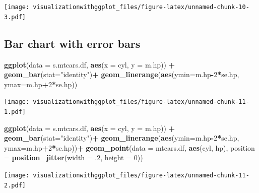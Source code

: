 \documentclass[]{krantz}
\makeatletter
\newenvironment{Shaded}{\begin{snugshade}}{\end{snugshade}}
\newcommand{\KeywordTok}[1]{\textcolor[rgb]{0.13,0.29,0.53}{\textbf{#1}}}
\newcommand{\DataTypeTok}[1]{\textcolor[rgb]{0.13,0.29,0.53}{#1}}
\newcommand{\DecValTok}[1]{\textcolor[rgb]{0.00,0.00,0.81}{#1}}
\newcommand{\StringTok}[1]{\textcolor[rgb]{0.31,0.60,0.02}{#1}}
\newcommand{\OperatorTok}[1]{\textcolor[rgb]{0.81,0.36,0.00}{\textbf{#1}}}
\newcommand{\NormalTok}[1]{#1}
\newenvironment{kframe}{%
\medskip{}
\setlength{\fboxsep}{.8em}
 \def\at@end@of@kframe{}%
 \ifinner\ifhmode%
  \def\at@end@of@kframe{\end{minipage}}%
  \begin{minipage}{\columnwidth}%
 \fi\fi%
 \def\FrameCommand##1{\hskip\@totalleftmargin \hskip-\fboxsep
 \colorbox{shadecolor}{##1}\hskip-\fboxsep
     \hskip-\linewidth \hskip-\@totalleftmargin \hskip\columnwidth}%
 \MakeFramed {\advance\hsize-\width
   \@totalleftmargin\z@ \linewidth\hsize
   \@setminipage}}%
 {\par\unskip\endMakeFramed%
 \at@end@of@kframe}
\renewenvironment{Shaded}{\begin{kframe}}{\end{kframe}}
\theoremstyle{definition}
\theoremstyle{definition}
\theoremstyle{definition}
\theoremstyle{remark}
\makeatother
\begin{document}
\texttt{[image: visualizationwithggplot\_files/figure-latex/unnamed-chunk-10-3.pdf]}

\subsection{Bar chart with error bars}\label{bar-chart-with-error-bars}

\begin{Shaded}
\begin{Highlighting}[]
\KeywordTok{ggplot}\NormalTok{(}\DataTypeTok{data =}\NormalTok{ s.mtcars.df, }\KeywordTok{aes}\NormalTok{(}\DataTypeTok{x =}\NormalTok{ cyl, }\DataTypeTok{y =}\NormalTok{ m.hp)) }\OperatorTok{+}
\StringTok{  }\KeywordTok{geom_bar}\NormalTok{(}\DataTypeTok{stat=}\StringTok{"identity"}\NormalTok{)}\OperatorTok{+}
\StringTok{  }\KeywordTok{geom_linerange}\NormalTok{(}\KeywordTok{aes}\NormalTok{(}\DataTypeTok{ymin=}\NormalTok{m.hp}\OperatorTok{-}\DecValTok{2}\OperatorTok{*}\NormalTok{se.hp, }\DataTypeTok{ymax=}\NormalTok{m.hp}\OperatorTok{+}\DecValTok{2}\OperatorTok{*}\NormalTok{se.hp))}
\end{Highlighting}
\end{Shaded}

\texttt{[image: visualizationwithggplot\_files/figure-latex/unnamed-chunk-11-1.pdf]}

\begin{Shaded}
\begin{Highlighting}[]
\KeywordTok{ggplot}\NormalTok{(}\DataTypeTok{data =}\NormalTok{ s.mtcars.df, }\KeywordTok{aes}\NormalTok{(}\DataTypeTok{x =}\NormalTok{ cyl, }\DataTypeTok{y =}\NormalTok{ m.hp)) }\OperatorTok{+}
\StringTok{  }\KeywordTok{geom_bar}\NormalTok{(}\DataTypeTok{stat=}\StringTok{"identity"}\NormalTok{)}\OperatorTok{+}
\StringTok{  }\KeywordTok{geom_linerange}\NormalTok{(}\KeywordTok{aes}\NormalTok{(}\DataTypeTok{ymin=}\NormalTok{m.hp}\OperatorTok{-}\DecValTok{2}\OperatorTok{*}\NormalTok{se.hp, }\DataTypeTok{ymax=}\NormalTok{m.hp}\OperatorTok{+}\DecValTok{2}\OperatorTok{*}\NormalTok{se.hp))}\OperatorTok{+}
\StringTok{  }\KeywordTok{geom_point}\NormalTok{(}\DataTypeTok{data =}\NormalTok{ mtcars.df, }\KeywordTok{aes}\NormalTok{(cyl, hp), }\DataTypeTok{position =} \KeywordTok{position_jitter}\NormalTok{(}\DataTypeTok{width =}\NormalTok{ .}\DecValTok{2}\NormalTok{, }\DataTypeTok{height =} \DecValTok{0}\NormalTok{))}
\end{Highlighting}
\end{Shaded}

\texttt{[image: visualizationwithggplot\_files/figure-latex/unnamed-chunk-11-2.pdf]}
\end{document}
